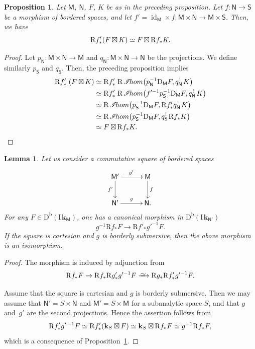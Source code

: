 \documentclass[11pt]{article}
\numberwithin{equation}{section}
\let\mathcal\mathscr
\newcommand{\isom}{\xrightarrow{{\raisebox{-.6ex}[0ex][0ex]{$\mspace{1mu}\textstyle\sim\mspace{2mu}$}}}}
\let\cl\colon
\newcommand{\bl}{\bigl(}
\newcommand{\br}{\bigr)}
\theoremstyle{plain}
\newtheorem{proposition}[theorem]{Proposition}
\newtheorem{lemma}[theorem]{Lemma}
\theoremstyle{definition}
\newcommand{\derived}[1]{\mathrm{#1}}
\newcommand{\derd}{\derived{D}}
\newcommand{\derr}{\derived{R}}
\newcommand{\BDC}{\derd^{\mathrm{b}}}
\newcommand{\roim}[1]{\derr#1_*}
\newcommand{\rihom}{{\derr\mspace{2mu}\shi\!hom}}
\newcommand{\epb}[1]{#1^{\mspace{1.5mu}!}\mspace{2mu}}
\newcommand{\etens}[1][]{\mathbin{\boxtimes_{\raise1.5ex\hbox to-.1em{}#1}}}
\newcommand{\sheaffont}[1]{\mathcal{#1}}
\newcommand\shi{\sheaffont{I}}
\DeclareMathOperator{\id}{id}
\newcommand{\dual}{\mathrm{D}}
\newcommand{\field}{\mathbf{k}}\let\cor\field
\newcommand{\ind}{\mathrm{I}\mspace{2mu}}
\newcommand{\ifield}{\ind\field}
\newcommand{\bbS}{\mathsf{S}}
\newcommand{\bbM}{\mathsf{M}}
\newcommand{\bbN}{\mathsf{N}}
\newcommand{\opb}[1]{#1^{-1}}
\begin{document}
\begin{proposition}\label{prop:extd}
Let $\bbM$, $\bbN$, $F$, $K$ be as in the preceding proposition.
Let $f\cl\bbN\to\bbS$ be a morphism of bordered spaces,
and let $f'=\id_ \bbM\times f\cl \bbM\times\bbN\to\bbM\times\bbS$.
Then, we have
\[\roim{f'}(F\etens K)\simeq F\etens\roim f K.\]
\end{proposition}
\begin{proof}
Let $p_\bbN\cl\bbM\times\bbN\to\bbM$ and $q_\bbN\cl\bbM\times\bbN\to\bbN$
be the projections.
We define similarly $p_\bbS$ and $q_\bbS$.
Then, the preceding proposition implies
\begin{align*}
\roim{f'}\; (F\etens K)
&\simeq \roim{f'}\;\rihom \bl{\opb p_\bbN}\dual_\bbM F, \epb{q_\bbN} K\br\\
&\simeq \roim{f'}\;\rihom \bl\opb{f'}{\opb p_\bbS}\dual_\bbM F, \epb{q_\bbN} K\br\\
&\simeq \rihom \bl{\opb p_\bbS}\dual_\bbM F, \roim{f'}\epb{q_\bbN} K\br\\
&\simeq \rihom \bl{\opb p_\bbS}\dual_\bbM F, \epb{q_\bbS}\roim{f}K\br\\
&\simeq F\etens \roim{f}K.\qedhere
\end{align*}
\end{proof}

\begin{lemma}\label{lem:carsq} Let us consider a commutative square of bordered spaces
\[\xymatrix@C=7ex{ \bbM'\ar[r]^{g'}\ar[d]_-{f'}& \bbM\ar[d]^-f\\
\bbN'\ar[r]^g& \bbN.}
\]
For any $F\in\BDC(\ifield_\bbM)$, one has a canonical morphism
in $\BDC(\ifield_{ \bbN'})$
\[\opb{g}\roim f F\to\roim{f'}\opb{g'}F.\]
If the square is cartesian and $g$ is borderly submersive,
then the above morphism is an isomorphism.
\end{lemma}

\begin{proof}
The morphism is induced by adjunction from
\[\roim f F\to\roim{f}\roim {g'}\opb{g'}F\isom\roim{g}\roim {f'}\opb{g'}F.\]

Assume that the square is cartesian and $g$ is borderly submersive. Then we may assume that
$ \bbN'=S\times \bbN$ and $ \bbM'=S\times \bbM$ for a subanalytic space $S$, and that $g$ and~$g'$ are the second projections.
Hence the assertion follows from
\[
\roim{f'}g^{\prime\,-1}F\simeq\roim{f'}(\cor_S\etens F)\simeq\cor_S\etens \roim f F\simeq\opb{g}\roim f F,
\]
which is a consequence of Proposition~\ref{prop:extd}.
\end{proof}
\end{document}
